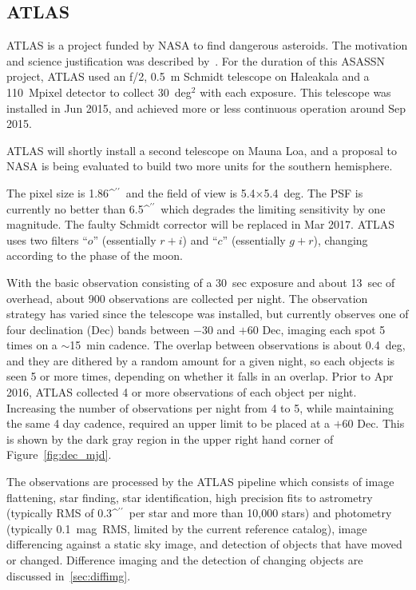 \documentclass[aps,prb,twocolumn,superscriptaddress]{revtex4-1}
\def\arcsec{\ifmmode^{\prime\prime}\else$^{\prime\prime}$\fi}
\begin{document}
\subsection{ATLAS}
ATLAS is a project funded by NASA to find dangerous asteroids.  The 
motivation and science justification was described by~\cite{ATLAS_data}.  
For the duration of this ASASSN project, ATLAS used an f/2, 0.5~m 
Schmidt telescope on Haleakala and a 110~Mpixel detector to collect 
30~deg$^2$ with each exposure.  This telescope was installed in Jun 
2015, and achieved more or less continuous operation around Sep 2015.  

ATLAS will shortly install a second telescope on Mauna Loa, and a 
proposal to NASA is being evaluated to build two more units for the 
southern hemisphere.

The pixel size is 1.86\arcsec\ and the field of view is
5.4$\times$5.4~deg.  The PSF is currently no better than 6.5\arcsec\
which degrades the limiting sensitivity by one magnitude.  The faulty
Schmidt corrector will be replaced in Mar 2017.  ATLAS uses two
filters ``$o$'' (essentially $r+i$) and ``$c$'' (essentially $g+r$),
changing according to the phase of the moon.

With the basic observation consisting of a 30~sec exposure and about 
13~sec of overhead, about 900 observations are collected per night.  
The observation strategy has varied since the telescope was 
installed, but currently observes one of four declination (Dec) bands between $-30$ 
and $+60$ Dec, imaging each spot 5 times on a $\sim$15~min cadence. 
The overlap between observations is about 0.4~deg, and they are 
dithered by a random amount for a given night, so each objects is seen 
5 or more times, depending on whether it falls in an overlap.  
Prior to Apr 2016, ATLAS collected 4 or more observations of each object 
per night. Increasing the number of observations per night from 4 to 5, 
while maintaining the same 4 day cadence, required an upper limit to 
be placed at a $+60$ Dec. This is shown by the dark gray region in 
the upper right hand corner of Figure~\ref{fig:dec_mjd}. 

The observations are processed by the ATLAS pipeline which consists of 
image flattening, star finding, star identification, high precision 
fits to astrometry (typically RMS of 0.3\arcsec\ per star and more 
than 10,000 stars) and photometry (typically 0.1~mag~RMS, limited by 
the current reference catalog), image differencing against a static sky 
image, and detection of objects that have moved or changed.  
Difference imaging and the detection of changing objects 
are discussed in~\cref{sec:diffimg}.
\end{document}
